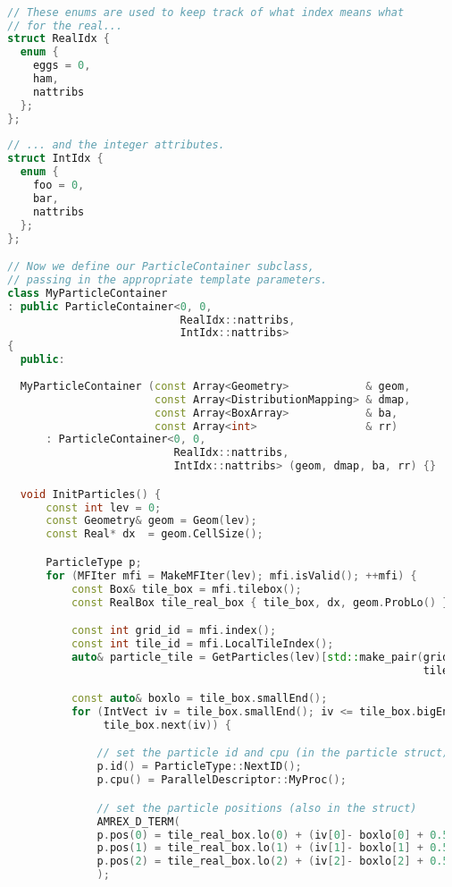 \begin{lstlisting}[language=cpp]

  // These enums are used to keep track of what index means what
  // for the real... 
  struct RealIdx {
    enum {
      eggs = 0,
      ham,
      nattribs
    };
  };
  
  // ... and the integer attributes.
  struct IntIdx {
    enum {
      foo = 0,
      bar,
      nattribs
    };
  };

  // Now we define our ParticleContainer subclass, 
  // passing in the appropriate template parameters.
  class MyParticleContainer
  : public ParticleContainer<0, 0,
                             RealIdx::nattribs,
                             IntIdx::nattribs>
  {
    public:
    
    MyParticleContainer (const Array<Geometry>            & geom,
                         const Array<DistributionMapping> & dmap,
                         const Array<BoxArray>            & ba,
                         const Array<int>                 & rr)
        : ParticleContainer<0, 0,
                            RealIdx::nattribs,
                            IntIdx::nattribs> (geom, dmap, ba, rr) {}

    void InitParticles() {
        const int lev = 0;
        const Geometry& geom = Geom(lev);
        const Real* dx  = geom.CellSize();

        ParticleType p;
        for (MFIter mfi = MakeMFIter(lev); mfi.isValid(); ++mfi) {
            const Box& tile_box = mfi.tilebox();
            const RealBox tile_real_box { tile_box, dx, geom.ProbLo() };

            const int grid_id = mfi.index();
            const int tile_id = mfi.LocalTileIndex();
            auto& particle_tile = GetParticles(lev)[std::make_pair(grid_id, 
                                                                   tile_id)];

            const auto& boxlo = tile_box.smallEnd();
            for (IntVect iv = tile_box.smallEnd(); iv <= tile_box.bigEnd(); 
                 tile_box.next(iv)) {

                // set the particle id and cpu (in the particle struct)
                p.id() = ParticleType::NextID();
                p.cpu() = ParallelDescriptor::MyProc();

                // set the particle positions (also in the struct)
                AMREX_D_TERM(
                p.pos(0) = tile_real_box.lo(0) + (iv[0]- boxlo[0] + 0.5)*dx[0];,
                p.pos(1) = tile_real_box.lo(1) + (iv[1]- boxlo[1] + 0.5)*dx[1];,
                p.pos(2) = tile_real_box.lo(2) + (iv[2]- boxlo[2] + 0.5)*dx[2];
                );


\end{lstlisting}
